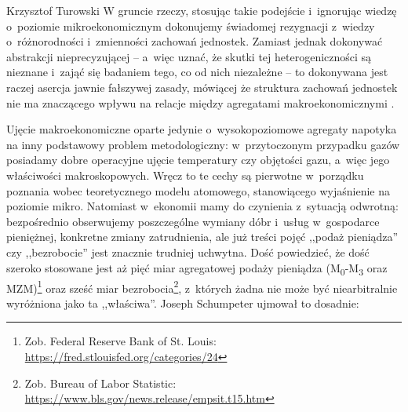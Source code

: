\begin{artplenv}{Krzysztof Turowski}
W gruncie rzeczy, stosując takie podejście i~ignorując wiedzę o~poziomie mikroekonomicznym dokonujemy świadomej
rezygnacji z~wiedzy o~różnorodności i~zmienności zachowań jednostek. Zamiast jednak dokonywać abstrakcji
nieprecyzującej  --  a~więc uznać, że skutki tej heterogeniczności są nieznane i~zająć się badaniem tego, co od
nich niezależne  --  to dokonywana jest raczej asercja jawnie fałszywej zasady, mówiącej że struktura zachowań
jednostek nie ma znaczącego wpływu na relacje między agregatami makroekonomicznymi
\parencite{long_realism_2006}.

Ujęcie makroekonomiczne oparte jedynie o~wysokopoziomowe agregaty napotyka na inny podstawowy problem
metodologiczny: w~przytoczonym przypadku gazów posiadamy dobre operacyjne ujęcie temperatury czy objętości
gazu, a~więc jego właściwości
makroskopowych. Wręcz to te cechy są pierwotne w~porządku poznania wobec teoretycznego modelu atomowego, stanowiącego
wyjaśnienie na poziomie mikro. Natomiast w~ekonomii mamy do czynienia z~sytuacją odwrotną: bezpośrednio obserwujemy
poszczególne wymiany dóbr i~usług w~gospodarce pieniężnej, konkretne zmiany zatrudnienia, ale już treści pojęć ,,podaż
pieniądza'' czy ,,bezrobocie'' jest znacznie trudniej uchwytna. Dość powiedzieć, że dość szeroko stosowane jest aż pięć
miar agregatowej podaży pieniądza (M\textsubscript{0}{}-M\textsubscript{3} oraz MZM)\footnote{Zob. Federal Reserve Bank
of St. Louis: \url{https://fred.stlouisfed.org/categories/24}} oraz sześć miar bezrobocia\footnote{Zob. Bureau of Labor
Statistic: \url{https://www.bls.gov/news.release/empsit.t15.htm}}, z~których żadna nie może być niearbitralnie
wyróżniona jako ta ,,właściwa''. Joseph Schumpeter
\parencite*{schumpeter_nature_2010}
ujmował to dosadnie:



\end{artplenv}
